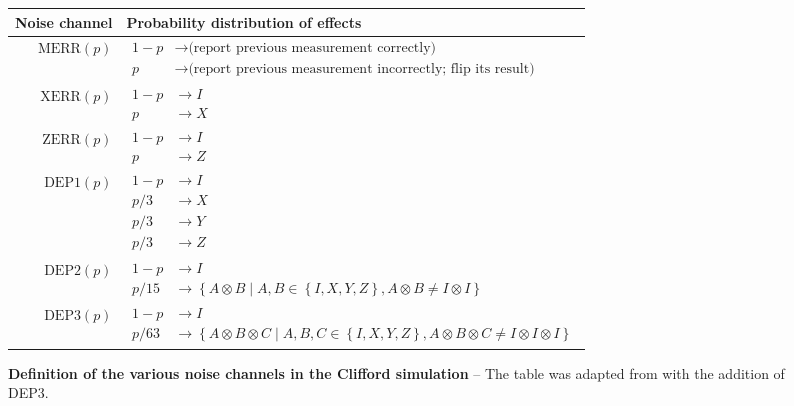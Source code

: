 \documentclass[twocolumn,notitlepage,nofootinbib,floatfix,superscriptaddress]{revtex4-1}
\begin{document}
\begin{figure}
    \centering
    \begin{tabular}{|r|l|}
    \hline
    Noise channel & Probability distribution of effects
    \\
    \hline
    $\text{MERR}(p)$ & $\begin{aligned}
        1-p &\rightarrow \text{(report previous measurement correctly)}
        \\
        p &\rightarrow \text{(report previous measurement incorrectly; flip its result)}
    \end{aligned}$
    \\
    \hline
    $\text{XERR}(p)$ & $\begin{aligned}
        1-p &\rightarrow I
        \\
        p &\rightarrow X
    \end{aligned}$
    \\
    \hline
    $\text{ZERR}(p)$ & $\begin{aligned}
        1-p &\rightarrow I
        \\
        p &\rightarrow Z
    \end{aligned}$
    \\
    \hline
    $\text{DEP1}(p)$ & $\begin{aligned}
        1-p &\rightarrow I
        \\
        p/3 &\rightarrow X
        \\
        p/3 &\rightarrow Y
        \\
        p/3 &\rightarrow Z
    \end{aligned}$
    \\
    \hline
    $\text{DEP2}(p)$ & $\begin{aligned}
        1-p &\rightarrow I
        \\
        p/15&\rightarrow\left\{ A\otimes B\mid A,B\in\left\{ I,X,Y,Z\right\} ,A\otimes B\neq I\otimes I\right\}
    \end{aligned}$\\
    \hline
    $\text{DEP3}(p)$ & $\begin{aligned}
        1-p &\rightarrow I
        \\
p/63&\rightarrow\left\{ A\otimes B\otimes C\mid A,B,C\in\left\{ I,X,Y,Z\right\} ,A\otimes B\otimes C\neq I\otimes I\otimes I\right\}    \end{aligned}$\\
    \hline
    \end{tabular}
\caption{\textbf{Definition of the various noise channels in the Clifford simulation} -- \label{fig:noisechannels} The table was adapted from \cite{gidney2024magic} with the addition of DEP3. }



\end{figure}
\end{document}
